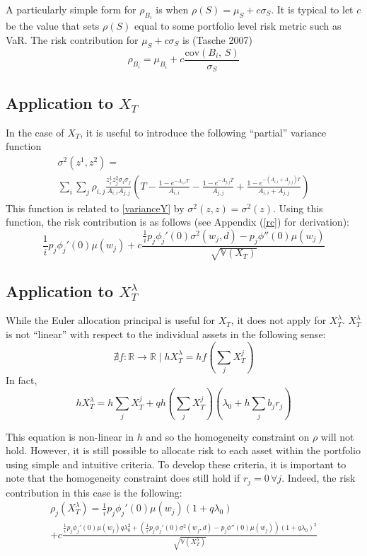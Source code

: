 \documentclass[12pt]{article}
\theoremstyle{definition}
\begin{document}
A particularly simple form for \(\rho_{B_i}\) is when \(\rho(S)=\mu_S+c\sigma_S\).  It is typical to let \(c\) be the value that sets \(\rho(S)\) equal to some portfolio level risk metric such as VaR.  The risk contribution for \(\mu_S+c\sigma_S\) is (Tasche 2007)
\begin{equation}
\rho_{B_i}=\mu_{B_i}+c\frac{\mathrm{cov}(B_i,\,S)}{\sigma_S}
\end{equation}
\subsection{Application to \(X_T\)}
In the case of \(X_T\), it is useful to introduce the following ``partial'' variance function 
\begin{multline} \sigma^2(z^1, z^2)=\\ \sum_i \sum_j \rho_{i,j} \frac{ z_i^1 z_j^2 \sigma_i \sigma_j}{A_{i,i} A_{j,j}} \left(T-\frac{1-e^{-A_{i,i}T}}{A_{i,i}}-\frac{1-e^{-A_{j,j}T}}{A_{j,j}}+\frac{1-e^{-(A_{i,i}+A_{j,j})T}}{A_{i,i}+A_{j,j}}\right) \end{multline}
This function is related to \ref{varianceY} by \(\sigma^2(z, z)=\sigma^2(z)\).  Using this function, the risk contribution is as follows (see Appendix (\ref{rc}) for derivation):
\begin{equation} \label{rcX}
\frac{1}{i}p_j \phi_j '(0)\mu (w_j)+c\frac{ \frac{1}{i}p_j \phi_j '(0) \sigma^2(w_j, d)-  p_j\phi''(0)  \mu(w_j)}{\sqrt{\mathbb{V}(X_T)}}
\end{equation}
\subsection{Application to \(X_T ^ \lambda\)} \label{appXTLambda}
While the Euler allocation principal is useful for \(X_T\),  it does not apply for \(X_T ^ \lambda\).   \(X_T ^\lambda\) is not ``linear'' with respect to the individual assets in the following sense:
\[\nexists f:\mathbb{R} \to \mathbb{R} \mid hX_T^\lambda= h f\left(\sum_j X_T ^ j\right)\]
In fact, 
\[ hX_T^\lambda=h\sum_j X_T ^ j+qh\left(\sum_j X_T ^ j\right)\left(\lambda_0+h\sum_j b_j r_j\right) \]

This equation is non-linear in \(h\) and so the homogeneity constraint on \(\rho\) will not hold.  However, it is still possible to allocate risk to each asset within the portfolio using simple and intuitive criteria.  To develop these criteria, it is important to note that the homogeneity constraint does still hold if \(r_j=0\,\forall j\).  Indeed, the risk contribution in this case is the following:
\begin{multline} \label{liquidRiskC}
 \rho_j(X_T ^ \lambda)=\frac{1}{i}p_j \phi_j '(0)\mu(w_j) \left(1+q\lambda_0   \right) \\ +c\frac{\frac{1}{i}p_j \phi_j '(0)\mu(w_j) q \lambda_0 ^2+\left(\frac{1}{i}p_j \phi_j '(0) \sigma^2(w_j, d)-p_j\phi''(0)   \mu(w_j) \right)(1+q \lambda_0)^2 }{\sqrt{\mathbb{V}(X_T ^ {\lambda})}}
\end{multline}
 
\end{document}

